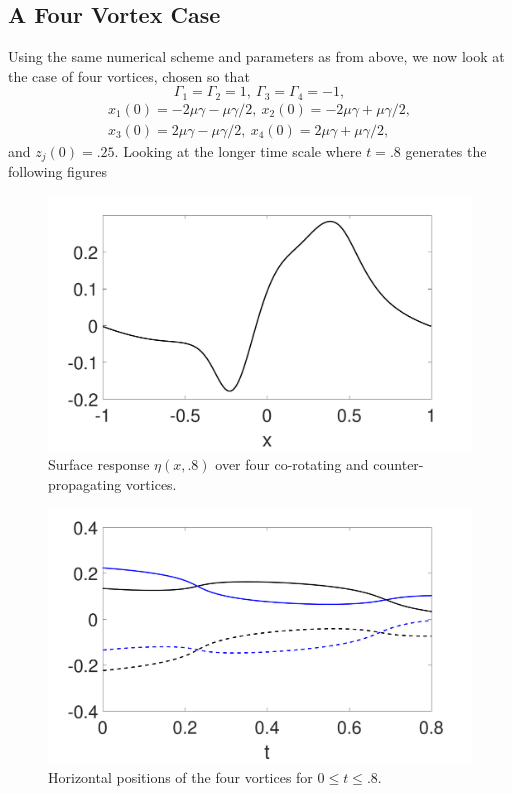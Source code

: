 \documentclass[a4paper,11pt]{article}
\begin{document}
\subsection*{A Four Vortex Case}
Using the same numerical scheme and parameters as from above, we now look at the case of four vortices, chosen so that
\[
\Gamma_{1}=\Gamma_{2}=1, ~ \Gamma_{3}=\Gamma_{4}=-1,
\]
\begin{align*}
x_{1}(0)=-2\mu\gamma-\mu\gamma/2, ~ x_{2}(0)=-2\mu\gamma+\mu\gamma/2,\\ x_{3}(0)=2\mu\gamma-\mu\gamma/2, ~ x_{4}(0)=2\mu\gamma+\mu\gamma/2,
\end{align*}
and $z_{j}(0)=.25$.  Looking at the longer time scale where $t=.8$ generates the following figures
\begin{figure}[!h]
\centering
\includegraphics[width=.75\textwidth]{surf_resp_mu_pt2_F_1_tf_pt8_4vort}
\caption{Surface response $\eta(x,.8)$ over four co-rotating and counter-propagating vortices.}
\label{fig:surfrep4}
\end{figure}
\begin{figure}[!h]
\centering
\includegraphics[width=.75\textwidth]{xtrack_mu_pt2_F_1_tf_pt8_4vort}
\caption{Horizontal positions of the four vortices for $0\leq t \leq .8$.}
\end{figure}
\end{document}
